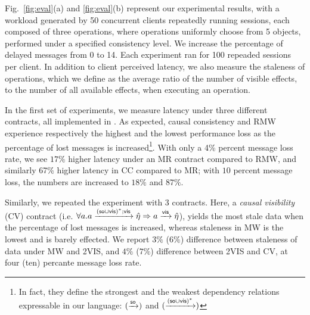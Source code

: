 
Fig.~\ref{fig:eval}(a) and \ref{fig:eval}(b) represent
our experimental results, with a workload generated 
by 50 concurrent clients repeatedly running sessions, each composed of three
operations, where operations uniformly choose from 5 objects,
performed under a specified consistency level. 
We increase the
percentage of delayed messages from 0 to 14.  Each experiment ran for
100 repeaded sessions per client. In addition to client perceived
latency, we also measure the staleness of operations, which we define as
the average ratio of the number of visible effects,
to the number of all available effects, when executing an operation.

In the first set of experiments, we measure latency under
three different \LB{} contracts, all implemented in \tool. As
expected,
causal consistency and RMW experience respectively the highest and the
lowest
performance loss as the percentage of lost messages is increased\footnote{In fact, 
they define the strongest and the weakest
\LB{} dependency relations expressable in our language:
$(\xrightarrow{{\textsf{so}}})$ and $(\xrightarrow{({\textsf{so}}\cup{\normalfont \textsf{vis}})^*})$}.
With only a 4\% percent message loss rate, we see $17\%$ higher latency under an MR
contract compared to RMW, and similarly 67\% higher latency in CC
compared to MR; with $10$ percent message loss, the numbers are
increased to $18\%$ and $87\%$.


Similarly, we repeated the experiment with 3 \UB{} contracts. Here, a
\emph{causal visibility} (CV) contract (i.e. {\footnotesize $ \forall a.
a\xrightarrow{({\textsf{so}}\cup{\normalfont \textsf{vis}})^*;{\normalfont \textsf{vis}}}\hat{\eta}\Rightarrow a\xrightarrow{{\normalfont \textsf{vis}}}
\hat{\eta} $}), yields the most stale data when the percentage of lost
messages is increased, whereas staleness in MW is the lowest and is
barely effected. We report $3\%$ ($6\%$) difference 
between staleness of data under MW and 2VIS, and $4\%$ ($7\%$)
difference between 2VIS and CV,
at four (ten) percante message
loss rate.



